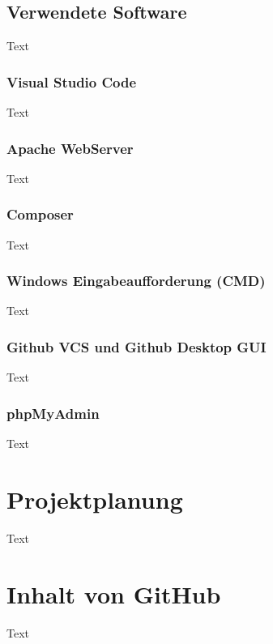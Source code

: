 \section{Verwendete Software}
Text
\subsection{Visual Studio Code}
Text
\subsection{Apache WebServer}
Text
\subsection{Composer}
Text
\subsection{Windows Eingabeaufforderung (CMD)}
Text
\subsection{Github VCS und Github Desktop GUI}
Text
\subsection{ phpMyAdmin}
Text



\chapter{Projektplanung}
Text

\chapter{Inhalt von GitHub}
Text






